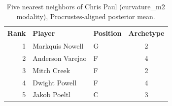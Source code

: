 \begin{table}[htbp]
  \centering\small
  \begin{tabular}{rllc}
    \toprule
    Rank & Player & Position & Archetype \\
    \midrule
    1 & Markquis Nowell & G & 2 \\
    2 & Anderson Varejao & F & 4 \\
    3 & Mitch Creek & F & 2 \\
    4 & Dwight Powell & F & 4 \\
    5 & Jakob Poeltl & C & 3 \\
    \bottomrule
  \end{tabular}
  \caption{Five nearest neighbors of Chris Paul (curvature_m2 modality), Procrustes-aligned posterior mean.}
  \label{tab:Chris_Paul_neighbors_curvature_m2}
\end{table}


